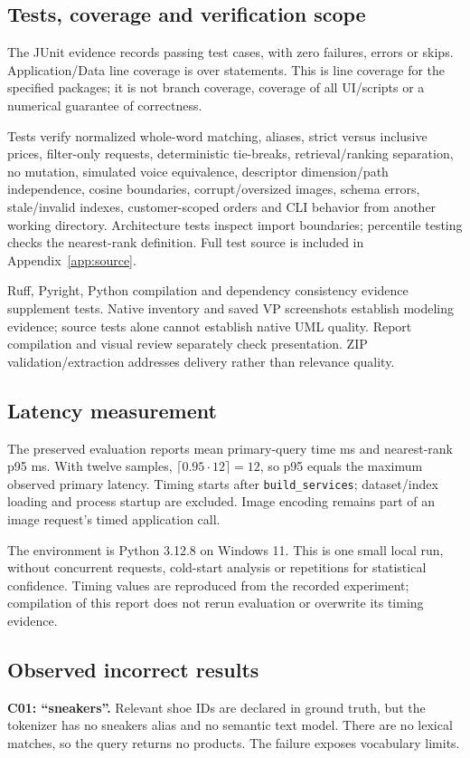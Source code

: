 \documentclass[11pt,a4paper]{article}
\begin{document}
\subsection{Tests, coverage and verification scope}
The JUnit evidence records \TestCount{} passing test cases, with zero failures, errors or skips. Application/Data line coverage is \CoveragePercent{} over \StatementCount{} statements. This is line coverage for the specified packages; it is not branch coverage, coverage of all UI/scripts or a numerical guarantee of correctness.

Tests verify normalized whole-word matching, aliases, strict versus inclusive prices, filter-only requests, deterministic tie-breaks, retrieval/ranking separation, no mutation, simulated voice equivalence, descriptor dimension/path independence, cosine boundaries, corrupt/oversized images, schema errors, stale/invalid indexes, customer-scoped orders and CLI behavior from another working directory. Architecture tests inspect import boundaries; percentile testing checks the nearest-rank definition. Full test source is included in Appendix~\ref{app:source}.

Ruff, Pyright, Python compilation and dependency consistency evidence supplement tests. Native inventory and saved VP screenshots establish modeling evidence; source tests alone cannot establish native UML quality. Report compilation and visual review separately check presentation. ZIP validation/extraction addresses delivery rather than relevance quality.

\subsection{Latency measurement}
The preserved evaluation reports mean primary-query time \MeanLatency{} ms and nearest-rank p95 \PninetyfiveLatency{} ms. With twelve samples, $\lceil0.95\cdot12\rceil=12$, so p95 equals the maximum observed primary latency. Timing starts after \texttt{build\_services}; dataset/index loading and process startup are excluded. Image encoding remains part of an image request's timed application call.

The environment is Python 3.12.8 on Windows 11. This is one small local run, without concurrent requests, cold-start analysis or repetitions for statistical confidence. Timing values are reproduced from the recorded experiment; compilation of this report does not rerun evaluation or overwrite its timing evidence.

\subsection{Observed incorrect results}
\textbf{C01: ``sneakers''.} Relevant shoe IDs are declared in ground truth, but the tokenizer has no sneakers alias and no semantic text model. There are no lexical matches, so the query returns no products. The failure exposes vocabulary limits.
\end{document}
